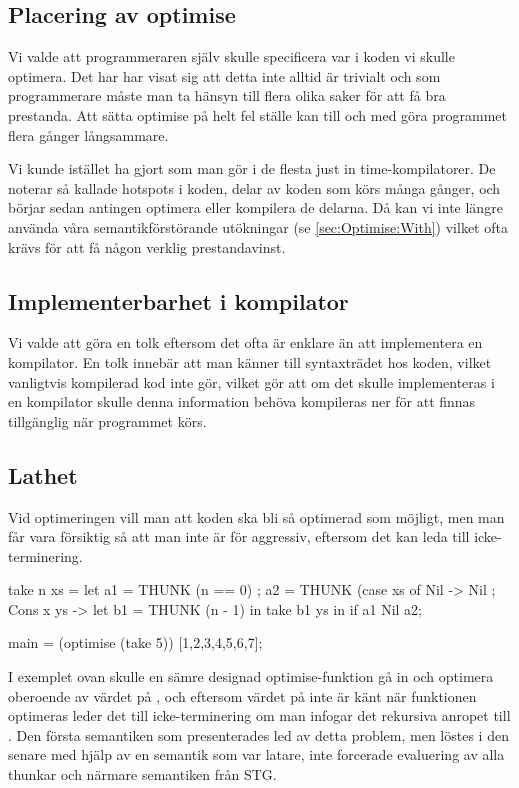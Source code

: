 \documentclass[Rapport]{subfiles}
\begin{document}
\subsection{Placering av optimise}

Vi valde att programmeraren själv skulle  specificera var i koden vi skulle optimera. Det har har visat sig att detta inte alltid är trivialt och som programmerare måste man ta hänsyn till flera olika saker för att få bra prestanda. Att sätta optimise på helt fel ställe kan till och med göra programmet flera gånger långsammare.

Vi kunde istället ha gjort som man gör i de flesta just in time-kompilatorer. De noterar så kallade hotspots i koden, delar av koden som körs många gånger, och börjar sedan antingen optimera eller kompilera de delarna. Då kan vi inte längre använda våra semantikförstörande utökningar (se \ref{sec:Optimise:With}) vilket ofta krävs för att få någon verklig prestandavinst. 






\subsection{Implementerbarhet i kompilator}
Vi valde att göra en tolk eftersom det ofta är enklare än att implementera en kompilator.
En tolk innebär att man känner till syntaxträdet hos koden, vilket vanligtvis kompilerad
kod inte gör, vilket gör att om det skulle implementeras i en kompilator skulle
denna information behöva kompileras ner för att finnas tillgänglig när programmet körs.


\subsection{Lathet}
Vid optimeringen vill man att koden ska bli så optimerad som möjligt, men man får
vara försiktig så att man inte är för aggressiv, 
eftersom det kan leda till icke-terminering.

\begin{codeEx}
take n xs = let
    { a1 = THUNK (n == 0)
    ; a2 = THUNK (case xs of
        { Nil -> Nil
        ; Cons x ys -> let
            { b1 = THUNK (n - 1)
            } in take b1 ys
        }
    } in if a1 Nil a2;

main = (optimise (take 5)) [1,2,3,4,5,6,7];
\end{codeEx}

I exemplet ovan skulle en sämre designad optimise-funktion gå in och optimera  oberoende av värdet på
, och eftersom värdet på  inte är känt när funktionen optimeras leder det till
icke-terminering om man infogar det rekursiva anropet till .
    Den första semantiken som presenterades led av detta problem, men löstes i den senare med hjälp av
en semantik som var latare, inte forcerade evaluering av alla thunkar och närmare semantiken från STG.
\end{document}
